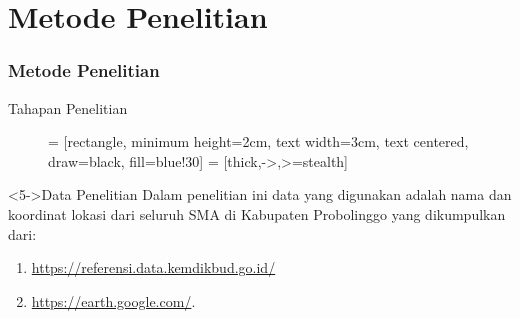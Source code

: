 \section{Metode Penelitian}
\begin{frame}
\frametitle{Metode Penelitian}
\begin{block}{Tahapan Penelitian}
\begin{figure}[H]
\centering
 = [rectangle, minimum height=2cm, text width=3cm, text centered, draw=black, fill=blue!30]
 = [thick,->,>=stealth]
\end{figure}
\end{block}

\begin{block}<5->{Data Penelitian}
Dalam penelitian ini data yang digunakan adalah nama dan koordinat lokasi dari seluruh SMA di Kabupaten Probolinggo yang dikumpulkan dari:

\begin{enumerate}
\item \url{https://referensi.data.kemdikbud.go.id/}
\item \url{https://earth.google.com/}.
\end{enumerate}
\end{block}
\end{frame}